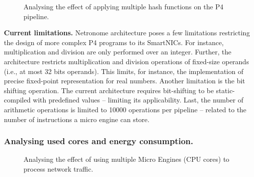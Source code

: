 \begin{figure}[!tb]
\centering
{}
        \caption{Analysing the effect of applying multiple hash functions on the P4 pipeline.}
        \label{fig4}
\end{figure}




\noindent \textbf{Current limitations.} Netronome architecture poses a few limitations restricting the design of more complex P4 programs to its SmartNICs. For instance, multiplication and division are only performed over an integer. Further, the architecture restricts multiplication and division operations of fixed-size operands (i.e., at most 32 bits operands). This limits, for instance, the implementation of precise fixed-point representation for real numbers. Another limitation is the bit shifting operation. The current architecture requires bit-shifting to be static-compiled with predefined values -- limiting its applicability. Last, the number of arithmetic operations is limited to 10000 operations per pipeline -- related to the number of instructions a micro engine can store. 





\subsubsection{Analysing used cores and energy consumption.}

\begin{figure}[!tb]
\centering
{}
        \caption{Analysing the effect of using multiple Micro Engines (CPU cores) to process network traffic.}
        \label{fig6}
\end{figure}

